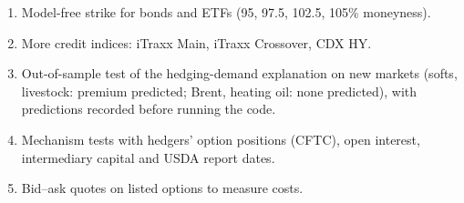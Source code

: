 \documentclass[10pt,a4paper]{article}
\newcommand{\head}[1]{\par\smallskip{\large\bfseries\color{accent}#1}\par\smallskip}
\begin{document}
\head{Next steps}
\begin{enumerate}
\item Model-free strike for bonds and ETFs (95, 97.5, 102.5, 105\% moneyness).
\item More credit indices: iTraxx Main, iTraxx Crossover, CDX HY.
\item Out-of-sample test of the hedging-demand explanation on new markets (softs, livestock: premium predicted; Brent, heating oil: none predicted), with predictions recorded before running the code.
\item Mechanism tests with hedgers' option positions (CFTC), open interest, intermediary capital and USDA report dates.
\item Bid--ask quotes on listed options to measure costs.
\end{enumerate}
\end{document}
